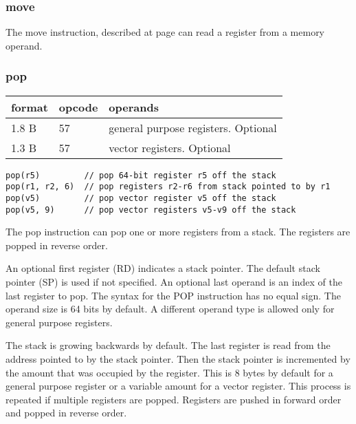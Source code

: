 \documentclass[forwardcom.tex]{subfiles}
\begin{document}
\subsubsection{move}
The move instruction, described at page \pageref{table:moveInstruction}
can read a register from a memory operand.

\subsubsection{pop}
\label{table:popInstruction}
\begin{tabular}{|p{12mm}|p{12mm}|p{110mm}|}
\hline
\bfseries format & \bfseries opcode & \bfseries operands \\ \hline
1.8 B & 57 & general purpose registers. Optional \\ 
1.3 B & 57 & vector registers. Optional \\ \hline
\end{tabular}
\vspace{2mm}

\begin{lstlisting}[frame=none]
pop(r5)         // pop 64-bit register r5 off the stack
pop(r1, r2, 6)  // pop registers r2-r6 from stack pointed to by r1
pop(v5)         // pop vector register v5 off the stack
pop(v5, 9)      // pop vector registers v5-v9 off the stack
\end{lstlisting}
\vspace{2mm}

The pop instruction can pop one or more registers from a stack. The registers are popped in reverse order.
\vspace{2mm}

An optional first register (RD) indicates a stack pointer. The default stack pointer (SP) is used if not specified. An optional last operand is an index of the last register to pop. The syntax for the POP instruction has no equal sign. The operand size is 64 bits by default. A different operand type is allowed only for general purpose registers.
\vspace{2mm}

The stack is growing backwards by default. The last register is read from the address pointed to by the stack pointer. Then the stack pointer is incremented by the amount that was occupied by the register. This is 8 bytes by default for a general purpose register or a variable amount for a vector register. This process is repeated if multiple registers are popped. Registers are pushed in forward order and popped in reverse order.
\vspace{2mm}
\end{document}
